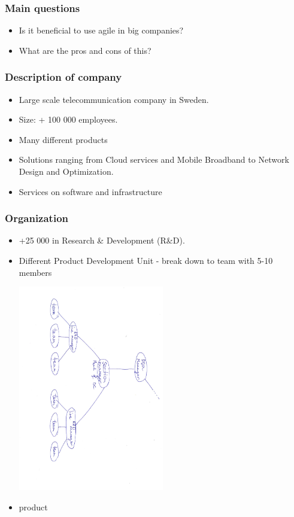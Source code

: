 \documentclass{beamer}
\begin{document}
\begin{frame}
  \frametitle{Main questions}
  \begin{itemize}
  \item Is it beneficial to use agile in big companies?
  \item What are the pros and cons of this?
  \end{itemize}
\end{frame}

\begin{frame}
  \frametitle{Description of company}
  \begin{itemize}
  \item  Large scale telecommunication company in Sweden.
  \item Size: + 100 000 employees.
  \item Many different products
  \item Solutions ranging from Cloud services and Mobile Broadband to Network Design and Optimization.
  \item Services on software and infrastructure
  
  \end{itemize}
\end{frame}

\begin{frame}
  \frametitle{Organization}
  \begin{itemize}
  \item +25 000 in Research \& Development (R\&D).
  \item Different Product Development Unit -  break down to team with 5-10 members
    \begin{center}
    \includegraphics[width=0.5\textwidth, angle=90,origin=c]{figs/structure.pdf}
  \end{center}
  \item product
  \end{itemize}

\end{frame}
\end{document}
